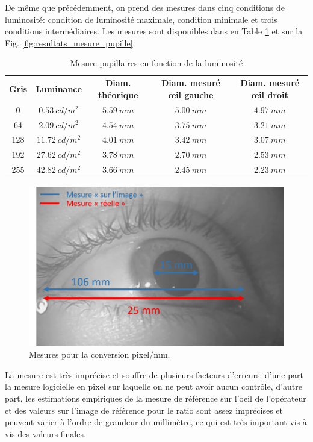 	\par De même que précédemment, on prend des mesures	dans cinq conditions de luminosité: condition de luminosité maximale, condition minimale et trois conditions intermédiaires. Les mesures sont disponibles dans en Table \ref{tab:mesure_pupillaire} et sur la Fig. \ref{fig:resultats_mesure_pupille}.
	
	\begin{table}[h]	
		\centering
		\caption{Mesure pupillaires en fonction de la luminosité}
		\label{tab:mesure_pupillaire}
		\small
		\begin{tabular}{ccccc}
			\textbf{Gris} & \textbf{Luminance} & \textbf{Diam. théorique} & \textbf{Diam. mesuré œil gauche} & \textbf{Diam. mesuré œil droit}\\
			0 & $0.53~cd/m^2$ & $5.59~mm$ & $5.00~mm$ & $4.97~mm$\\
			64 & $2.09~cd/m^2$ & $4.54~mm$ & $3.75~mm$ & $3.21~mm$\\
			128 & $11.72~cd/m^2$ & $4.01~mm$ & $3.42~mm$ & $3.07~mm$\\
			192 & $27.62~cd/m^2$ & $3.78~mm$ & $2.70~mm$ & $2.53~mm$\\
			255 & $42.82~cd/m^2$ & $3.66~mm$ & $2.45~mm$ & $2.23~mm$\\
		\end{tabular}
	\end{table}
	
	\begin{figure}
		\centering
		\includegraphics[scale=.7]{Figures/MesureReferenceOeil}
		\caption{Mesures pour la conversion pixel/mm.}
		\label{fig:mesure_reference}
	\end{figure}
	
	\par La mesure est très imprécise et souffre de plusieurs facteurs d'erreurs: d'une part la mesure logicielle en pixel sur laquelle on ne peut avoir aucun contrôle, d'autre part, les estimations empiriques de la mesure de référence sur l'oeil de l'opérateur et des valeurs sur l'image de référence pour le ratio sont assez imprécises et peuvent varier à l'ordre de grandeur du millimètre, ce qui est très important vis à vis des valeurs finales.
	
